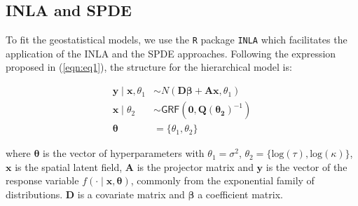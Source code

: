 \documentclass{article}
\begin{document}
\subsection{INLA and SPDE}

To fit the geostatistical models, we use the \texttt{R} package \texttt{INLA} which facilitates the application of the INLA and the SPDE approaches. Following the expression proposed in (\ref{eqn:eq1}), the structure for the hierarchical model is: %



\begin{align}
\mathbf{y} \mid \mathbf{x}, \theta_{1} & \sim N(\boldsymbol{D\beta} + \mathbf{A} \mathbf{x}, \theta_{1}) \label{eqn:eq3}\\
\mathbf{x} \mid \theta_{2} & \sim \mathsf{GRF}(\boldsymbol{0}, \boldsymbol{Q(\theta_{2})}^{-1}) \label{eqn:eq4}\\
\boldsymbol{\theta} & = \{\theta_{1}, \theta_{2}\}\label{eqn:eq5}
\end{align}

where $\boldsymbol{\theta}$ is the vector of hyperparameters with $\theta_{1} = \sigma^{2}$, $\theta_{2} = \{\text{log}(\tau), \text{log}(\kappa)\}$, $\boldsymbol{x}$ is the spatial latent field, $\boldsymbol{A}$ is the projector matrix and $\boldsymbol{y}$ is the vector of the response variable $f(\cdot \mid \boldsymbol{x}, \boldsymbol{\theta})$, commonly from the exponential family of distributions. $\boldsymbol{D}$ is a covariate matrix and $\boldsymbol{\beta}$ a coefficient matrix. 
\end{document}
